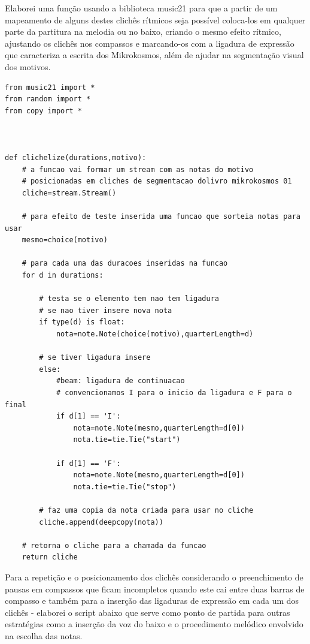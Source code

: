 \documentclass[
	12pt,				%
	openright,			%
	twoside,			%
	a4paper,			%
	english,			%
	french,				%
	spanish,			%
	brazil				%
	]{abntex2}
\begin{document}
Elaborei uma função usando a biblioteca music21 para que a partir de um mapeamento de alguns destes clichês rítmicos seja possível coloca-los em qualquer parte da partitura na melodia ou no baixo, criando o mesmo efeito rítmico, ajustando os clichês nos compassos e marcando-os com a ligadura de expressão que caracteriza a escrita dos Mikrokosmos, além de ajudar na segmentação visual dos motivos.

\begin{lstlisting}
from music21 import *
from random import *
from copy import *



def clichelize(durations,motivo):
	# a funcao vai formar um stream com as notas do motivo
	# posicionadas em cliches de segmentacao dolivro mikrokosmos 01
	cliche=stream.Stream()

	# para efeito de teste inserida uma funcao que sorteia notas para usar
	mesmo=choice(motivo)

	# para cada uma das duracoes inseridas na funcao
	for d in durations:

		# testa se o elemento tem nao tem ligadura
		# se nao tiver insere nova nota
		if type(d) is float:	
			nota=note.Note(choice(motivo),quarterLength=d)

		# se tiver ligadura insere 
		else:	
			#beam: ligadura de continuacao
			# convencionamos I para o inicio da ligadura e F para o final
			if d[1] == 'I':
				nota=note.Note(mesmo,quarterLength=d[0])
				nota.tie=tie.Tie("start")
				
			if d[1] == 'F':
				nota=note.Note(mesmo,quarterLength=d[0])
				nota.tie=tie.Tie("stop")

		# faz uma copia da nota criada para usar no cliche
		cliche.append(deepcopy(nota))

	# retorna o cliche para a chamada da funcao
	return cliche

\end{lstlisting}

Para a repetição e o posicionamento dos clichês considerando o preenchimento de pausas em compassos que ficam incompletos quando este cai entre duas barras de compasso e também para a inserção das ligaduras de expressão em cada um dos clichês - elaborei o script abaixo que serve como ponto de partida para outras estratégias como a inserção da voz do baixo e o procedimento melódico envolvido na escolha das notas.
\end{document}

